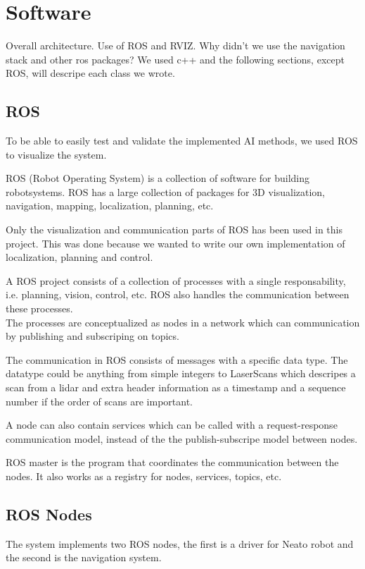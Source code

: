 
\section{Software} 
\label{sec:software}

Overall architecture.
Use of ROS and RVIZ.
Why didn't we use the navigation stack and other ros packages?
We used c++ and the following sections, except ROS, will descripe each class we wrote.

\subsection{ROS}
To be able to easily test and validate the implemented AI methods, we used ROS to visualize the system.

ROS (Robot Operating System) is a collection of software for building robotsystems.
ROS has a large collection of packages for 3D visualization, navigation, mapping, localization, planning, etc.  

Only the visualization and communication parts of ROS has been used in this project.
This was done because we wanted to write our own implementation of localization, planning and control.

A ROS project consists of a collection of processes with a single responsability, i.e. planning, vision, control, etc. 
ROS also handles the communication between these processes.\\
The processes are conceptualized as nodes in a network which can communication by publishing and subscriping on topics.

The communication in ROS consists of messages with a specific data type.
The datatype could be anything from simple integers to LaserScans which descripes a scan from a lidar and extra header information as a timestamp and a sequence number if the order of scans are important.

A node can also contain services which can be called with a request-response communication model, instead of the the publish-subscripe model between nodes.

ROS master is the program that coordinates the communication between the nodes.
It also works as a registry for nodes, services, topics, etc.

\subsection{ROS Nodes}
The system implements two ROS nodes, the first is a driver for Neato robot and the second is the navigation system.\\

